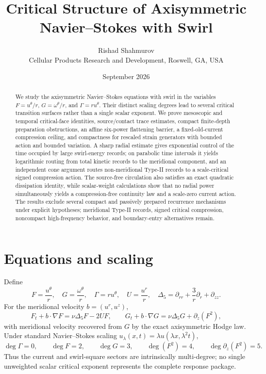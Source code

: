 \documentclass[11pt]{article}
\title{\textbf{Critical Structure of Axisymmetric Navier--Stokes with Swirl}}
\author{Rishad Shahmurov\\\small Cellular Products Research and Development, Roswell, GA, USA}
\date{September 2026}
\theoremstyle{definition}\newtheorem{definition}[theorem]{Definition}
\theoremstyle{remark}\newtheorem{remark}[theorem]{Remark}
\begin{document}
\maketitle
\begin{abstract}
We study the axisymmetric Navier--Stokes equations with swirl in the variables $F=u^\theta/r$, $G=\omega^\theta/r$, and $\Gamma=ru^\theta$.  Their distinct scaling degrees lead to several critical transition surfaces rather than a single scalar exponent.  We prove mesoscopic and temporal critical-face identities, source/contact trace estimates, compact finite-depth preparation obstructions, an affine six-power flattening barrier, a fixed-old-current compression ceiling, and compactness for rescaled strain generators with bounded action and bounded variation.  A sharp radial estimate gives exponential control of the time occupied by large swirl-energy records; on parabolic time intervals it yields logarithmic routing from total kinetic records to the meridional component, and an independent cone argument routes non-meridional Type-II records to a scale-critical signed compression action.  The source-free circulation also satisfies an exact quadratic dissipation identity, while scalar-weight calculations show that no radial power simultaneously yields a compression-free continuity law and a scale-zero current action.  The results exclude several compact and passively prepared recurrence mechanisms under explicit hypotheses; meridional Type-II records, signed critical compression, noncompact high-frequency behavior, and boundary-entry alternatives remain.
\end{abstract}

\section{Equations and scaling}
Define
\[
F=\frac{u^\theta}{r},\quad G=\frac{\omega^\theta}{r},\quad \Gamma=ru^\theta,\quad U=\frac{u^r}{r},\quad \Delta_5=\partial_{rr}+\frac3r\partial_r+\partial_{zz}.
\]
For the meridional velocity $b=(u^r,u^z)$,
\[
F_t+b\cdot\nabla F=\nu\Delta_5F-2UF,
\qquad
G_t+b\cdot\nabla G=\nu\Delta_5G+\partial_z(F^2),
\]
with meridional velocity recovered from $G$ by the exact axisymmetric Hodge law. Under standard Navier--Stokes scaling $u_\lambda(x,t)=\lambda u(\lambda x,\lambda^2t)$,
\[
\deg \Gamma=0,\qquad \deg F=2,\qquad \deg G=3,\qquad \deg(F^2)=4,\qquad \deg \partial_z(F^2)=5.
\]
Thus the current and swirl-square sectors are intrinsically multi-degree; no single unweighted scalar critical exponent represents the complete response package.
\end{document}
